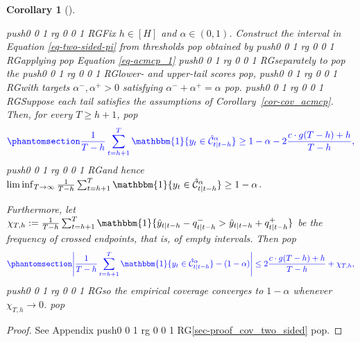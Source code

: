 \documentclass[
  american,
  12pt]{article}
\theoremstyle{plain}
\theoremstyle{plain}
\newtheorem{corollary}{Corollary}[section]
\theoremstyle{remark}
\newcommand{\CPTSadd}[1]{\ifmmode\else\leavevmode\fi\pdfcolorstack 0 push{0 0 1 rg 0 0 1 RG}#1\pdfcolorstack 0 pop}
\begin{document}
\begin{corollary}[]\protect\hypertarget{cor-cov-two-sided}{}\label{cor-cov-two-sided}

\CPTSadd{Fix \(h\in[H]\) and \(\alpha\in(0,1)\). Construct the interval in
Equation \eqref{eq-two-sided-pi} from thresholds} obtained by \CPTSadd{applying}
Equation \eqref{eq-acmcp_1} \CPTSadd{separately to} the \CPTSadd{lower- and upper-tail
scores}, \CPTSadd{with targets \(\alpha^{-},\alpha^{+}>0\) satisfying
\(\alpha^{-}+\alpha^{+}=\alpha\)}. \CPTSadd{Suppose each tail satisfies the
assumptions of Corollary~\ref{cor-cov_acmcp}. Then, for every
\(T\geq h+1\),}
\begin{equation}\CPTSadd{\phantomsection\label{eq-two-sided-finite}{
\frac{1}{T-h}\sum_{t=h+1}^{T}\mathbbm{1}\{y_t\in\hat{\mathcal C}_{t|t-h}^{\alpha}\}
\geq 1-\alpha-2\frac{c\cdot g(T-h)+h}{T-h},
}}\end{equation} \CPTSadd{and hence
\(\liminf_{T\to\infty}\frac{1}{T-h}\sum_{t=h+1}^{T}\mathbbm{1}\{y_t\in\hat{\mathcal C}_{t|t-h}^{\alpha}\}\geq1-\alpha\).

Furthermore, let
\(\chi_{T,h}:=\frac{1}{T-h}\sum_{t=h+1}^{T}\mathbbm{1}\{\hat y_{t|t-h}-q_{t|t-h}^{-}>\hat y_{t|t-h}+q_{t|t-h}^{+}\}\)
be the frequency of crossed endpoints, that is, of empty intervals. Then}
\begin{equation}\CPTSadd{\phantomsection\label{eq-two-sided-enhanced}{
\left|\frac{1}{T-h}\sum_{t=h+1}^{T}\mathbbm{1}\{y_t\in\hat{\mathcal C}_{t|t-h}^{\alpha}\}
-(1-\alpha)\right|\leq 2\frac{c \cdot g(T-h)+h}{T-h}+\chi_{T,h},
}}\end{equation} \CPTSadd{so the empirical coverage converges to \(1-\alpha\)
whenever \(\chi_{T,h}\to0\).}

\end{corollary}

\begin{proof}
See Appendix \CPTSadd{\ref{sec-proof_cov_two_sided}}.
\end{proof}
\end{document}
